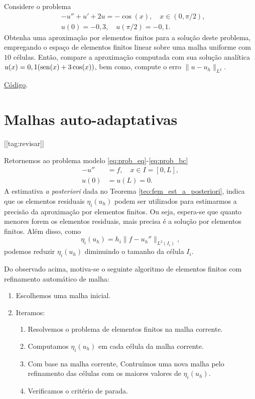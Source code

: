 \begin{exer}\label{exer:dcr}
  Considere o problema
  \begin{align}
    &-u'' + u' + 2u = -\cos(x),\quad x\in (0, \pi/2),\\
    &u(0)=-0,3,\quad u(\pi/2)=-0,1.
  \end{align}
  Obtenha uma aproximação por elementos finitos para a solução deste problema, empregando o espaço de elementos finitos linear sobre uma malha uniforme com $10$ células. Então, compare a aproximação computada com sua solução analítica $u(x) = 0,1(\operatorname{sen}(x)+3\cos(x))$, bem como, compute o erro $\|u-u_h\|_{L^2}$.
\end{exer}
\begin{resp}
  \ifispython
  \href{https://github.com/phkonzen/notas/blob/master/src/MetodoElementosFinitos/cap_mef1d/dados/exer_dcr/exer_dcr.py}{Código}.
  \fi
\end{resp}

\section{Malhas auto-adaptativas}\label{cap_mef1d_sec_adapt}
[[tag:revisar]]

Retornemos ao problema modelo \eqref{eq:prob_eq}-\eqref{eq:prob_bc}
\begin{align}
  -u'' &= f,\quad x\in I=[0,L],\\
  u(0) &= u(L) = 0.
\end{align}
A estimativa {\it a posteriori} dada no Teorema \ref{teo:fem_est_a_posteriori}, indica que os elementos residuais $\eta_i(u_h)$ podem ser utilizados para estimarmos a precisão da aproximação por elementos finitos. Ou seja, espera-se que quanto menores forem os elementos residuais, mais precisa é a solução por elementos finitos. Além disso, como
\begin{equation}
  \eta_i(u_h) = h_i\|f - u_h''\|_{L^2(I_i)},
\end{equation}
podemos reduzir $\eta_i(u_h)$ diminuindo o tamanho da célula $I_i$.

Do observado acima, motiva-se o seguinte algoritmo de elementos finitos com refinamento automático de malha:
\begin{enumerate}
\item Escolhemos uma malha inicial.
\item Iteramos:
  \begin{enumerate}[2.]
  \item Resolvemos o problema de elementos finitos na malha corrente.
  \item Computamos $\eta_i(u_h)$ em cada célula da malha corrente.
  \item Com base na malha corrente, Contruímos uma nova malha pelo refinamento das células com os maiores valores de $\eta_i(u_h)$.
  \item Verificamos o critério de parada.
  \end{enumerate}
\end{enumerate}

